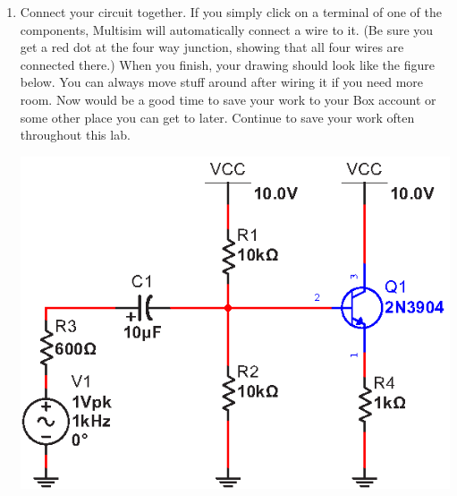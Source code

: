 \begin{enumerate}[wide]
\pagebreak[2]
\item Connect your circuit together.  If you simply click on a terminal of one of the components, Multisim will automatically connect a wire to it.  (Be sure you get a red dot at the four way junction, showing that all four wires are connected there.)  When you finish, your drawing should look like the figure below.  You can always move stuff around after wiring it if you need more room.  Now would be a good time to save your work to your Box account or some other place you can get to later.  Continue to save your work often throughout this lab.
\begin{center}
\includegraphics{multisim/wired.eps}
\end{center}


\end{enumerate}

